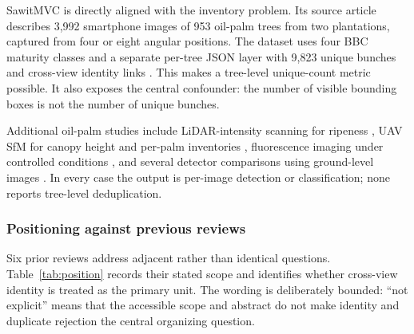 SawitMVC is directly aligned with the inventory problem. Its source article describes 3{,}992 smartphone images of 953 oil-palm trees from two plantations, captured from four or eight angular positions. The dataset uses four BBC maturity classes and a separate per-tree JSON layer with 9{,}823 unique bunches and cross-view identity links \cite{indriani2026sawitmvc}. This makes a tree-level unique-count metric possible. It also exposes the central confounder: the number of visible bounding boxes is not the number of unique bunches.

Additional oil-palm studies include LiDAR-intensity scanning for ripeness \cite{ledger_r_97003608b250cdc5}, UAV SfM for canopy height and per-palm inventories \cite{ledger_m_084cfd5badbb63d3}, fluorescence imaging under controlled conditions \cite{ledger_r_1c81e223679e4bfe}, and several detector comparisons using ground-level images \cite{ledger_r_134385f2faed38a6}. In every case the output is per-image detection or classification; none reports tree-level deduplication.



\subsubsection{Positioning against previous reviews}

Six prior reviews address adjacent rather than identical questions. Table~\ref{tab:position} records their stated scope and identifies whether cross-view identity is treated as the primary unit. The wording is deliberately bounded: ``not explicit'' means that the accessible scope and abstract do not make identity and duplicate rejection the central organizing question.

